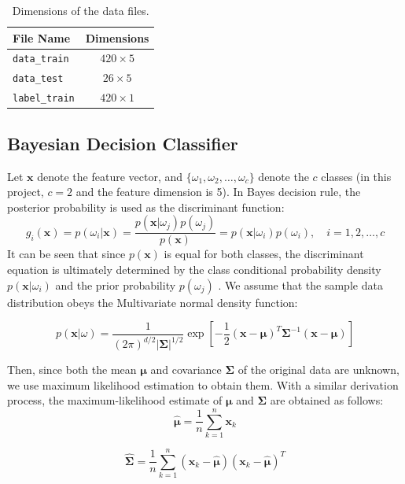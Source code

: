 \documentclass[12pt, onecolumn]{article}
\begin{document}
\begin{table}[htbp]
\centering
\begin{tabular}{lc}
\hline
\textbf{File Name} & \textbf{Dimensions} \\
\hline
\texttt{data\_train} & \(420 \times 5\) \\
\texttt{data\_test}  & \(26 \times 5\)  \\
\texttt{label\_train} & \(420 \times 1\) \\
\hline
\end{tabular}
\caption{Dimensions of the data files.}
\label{tab:data_dimensions}
\end{table}


\subsection{Bayesian Decision Classifier}
Let $\mathbf{x}$ denote the feature vector, and $\{\omega_1, \omega_2, \ldots, \omega_c\}$ denote the $c$ classes (in this project, $c = 2$ and the feature dimension is 5). In Bayes decision rule, the posterior probability is used as the discriminant function:
\[
g_i(\mathbf{x}) = p(\omega_i|\mathbf{x}) = \frac{p(\mathbf{x}|\omega_j)p(\omega_j)}{p(\mathbf{x})} = p(\mathbf{x}|\omega_i)p(\omega_i) , \quad i = 1,2, \ldots, c
\]
It can be seen that since ${p(\mathbf{x})}$ is equal for both classes, the discriminant equation is ultimately determined by the class conditional probability density $p(\mathbf{x}|\omega_i)$ and the prior probability $p(\omega_j)$ . We assume that the sample data distribution obeys the Multivariate normal density function:

\[
p(\mathbf{x}|\omega) = \frac{1}{(2\pi)^{d/2}|\mathbf{\Sigma}|^{1/2}} \exp \left[ -\frac{1}{2} (\mathbf{x} - \mathbf{\mu})^T \mathbf{\Sigma}^{-1} (\mathbf{x} - \mathbf{\mu}) \right]
\]

Then, since both the mean \(\mathbf{\mu}\) and covariance \(\mathbf{\Sigma}\) of the original data are unknown, we use maximum likelihood estimation to obtain them. With a similar derivation process, the maximum-likelihood estimate of \(\mathbf{\mu}\) and \(\mathbf{\Sigma}\) are obtained as follows:
\[
\hat{\mathbf{\mu}} = \frac{1}{n} \sum_{k=1}^{n} \mathbf{x}_k
\]

\[
\hat{\mathbf{\Sigma}} = \frac{1}{n} \sum_{k=1}^{n} (\mathbf{x}_k - \hat{\mathbf{\mu}})(\mathbf{x}_k - \hat{\mathbf{\mu}})^T
\]
\end{document}

